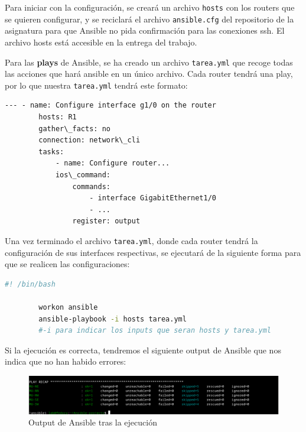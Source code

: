 \documentclass[11pt]{article}
\begin{document}
Para iniciar con la configuración, se creará un archivo \texttt{hosts} con los routers que se quieren configurar, y se reciclará el archivo \texttt{ansible.cfg} del repositorio de la asignatura para que Ansible no pida confirmación para las conexiones ssh. El archivo hosts está accesible en la entrega del trabajo. 

Para las \textbf{plays} de Ansible, se ha creado un archivo \texttt{tarea.yml} que recoge todas las acciones que hará ansible en un único archivo. Cada router tendrá una play, por lo que nuestra \texttt{tarea.yml} tendrá este formato:

\begin{tcolorbox}[
    boxrule=0pt,
    title=Formato que seguirá tarea.yml,
]
    \begin{lstlisting}[gobble=6]
        --- - name: Configure interface g1/0 on the router 
        hosts: R1
        gather\_facts: no 
        connection: network\_cli 
        tasks:
            - name: Configure router...
            ios\_command:
                commands:
                    - interface GigabitEthernet1/0
                    - ... 
                register: output

    \end{lstlisting}
\end{tcolorbox}

Una vez terminado el archivo \texttt{tarea.yml}, donde cada router tendrá la configuración de sus interfaces respectivas, se ejecutará de la siguiente forma para que se realicen las configuraciones:

\begin{tcolorbox}[
    boxrule=0pt,
    title=Script de ejecución de Ansible,
]
    \begin{lstlisting}[language=bash, gobble=6]
        #! /bin/bash

        workon ansible
        ansible-playbook -i hosts tarea.yml
        #-i para indicar los inputs que seran hosts y tarea.yml
    \end{lstlisting}
\end{tcolorbox}

Si la ejecución es correcta, tendremos el siguiente output de Ansible que nos indica que no han habido errores:

\begin{figure}[h]
    \centering
    \includegraphics[width=\textwidth]{src/ansible.png}
    \caption{Output de Ansible tras la ejecución}
\end{figure}
\end{document}
